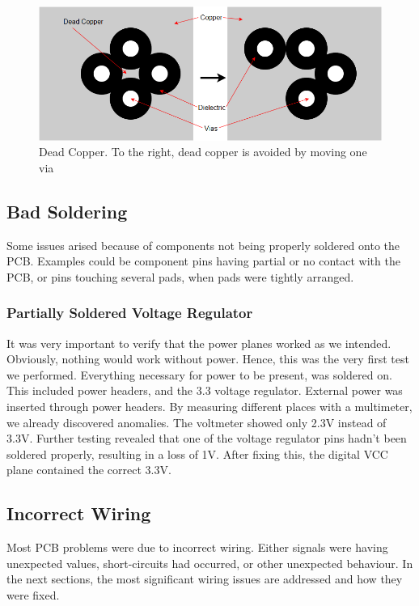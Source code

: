 \begin{figure}[h!]
\centering
\includegraphics[scale = 0.4]{images/Dead_Copper.png}
\caption{Dead Copper. To the right, dead copper is avoided by moving one via}
\label{fig:Dead copper}
\end{figure}

\subsection{Bad Soldering}
Some issues arised because of components not being properly soldered onto the PCB. Examples could be component pins having partial or no contact with the PCB, or pins touching several pads, when pads were tightly arranged.

\subsubsection{Partially Soldered Voltage Regulator} 
It was very important to verify that the power planes worked as we intended. Obviously, nothing would work without power. Hence, this was the very first test we performed.
\newline
Everything necessary for power to be present, was soldered on. This included power headers, and the 3.3 voltage regulator. External power was inserted through power headers. By measuring different places with a multimeter, we already discovered anomalies. The voltmeter showed only 2.3V instead of 3.3V. Further testing revealed that one of the voltage regulator pins hadn't been soldered properly, resulting in a loss of 1V. After fixing this, the digital VCC plane contained the correct 3.3V.

\subsection{Incorrect Wiring}
Most PCB problems were due to incorrect wiring. Either signals were having unexpected values, short-circuits had occurred, or other unexpected behaviour. In the next sections, the most significant wiring issues are addressed and how they were fixed.

